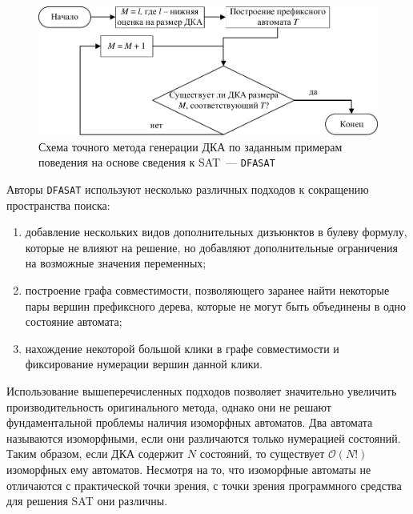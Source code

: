 \begin{figure}[ht]
  \centering
  \includegraphics[scale=0.9]{img/ntv/basic.pdf}
  \caption{Схема точного метода генерации ДКА по заданным примерам поведения на основе сведения к SAT~--- \texttt{DFASAT}}
  \label{syn:img:dfasat-algo}
\end{figure}

Авторы \texttt{DFASAT} используют несколько различных подходов к сокращению пространства поиска:
\begin{enumerate}
  \item добавление нескольких видов дополнительных дизъюнктов в булеву формулу, которые не влияют на решение, но добавляют дополнительные ограничения на возможные значения переменных;
  \item построение графа совместимости, позволяющего заранее найти некоторые пары вершин префиксного дерева, которые не могут быть объединены в одно состояние автомата;
  \item нахождение некоторой большой клики в графе совместимости и фиксирование нумерации вершин данной клики.
\end{enumerate}

Использование вышеперечисленных подходов позволяет значительно увеличить производительность оригинального метода, однако они не решают фундаментальной проблемы наличия изоморфных автоматов.
Два автомата называются изоморфными, если они различаются только нумерацией состояний.
Таким образом, если ДКА содержит $N$ состояний, то существует $\mathcal{O}\left(N!\right)$ изоморфных ему автоматов.
Несмотря на то, что изоморфные автоматы не отличаются с практической точки зрения, с точки зрения программного средства для решения SAT они различны.

